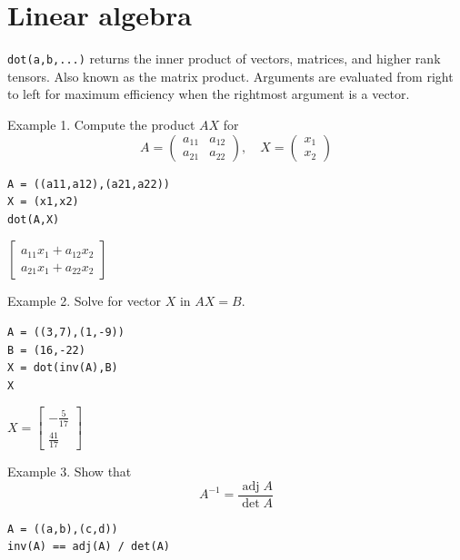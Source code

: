 
\newpage

\section{Linear algebra}

\verb$dot(a,b,...)$ returns the inner product of vectors, matrices,
and higher rank tensors.
Also known as the matrix product.
Arguments are evaluated from right to left
for maximum efficiency when the rightmost argument is a vector.

\bigskip

Example 1. Compute the product $AX$ for
\begin{equation*}
A=\begin{pmatrix}a_{11}&a_{12}\\a_{21}&a_{22}\end{pmatrix},
\quad
X=\begin{pmatrix}x_1\\x_2\end{pmatrix}
\end{equation*}

{\color{blue}
\begin{verbatim}
A = ((a11,a12),(a21,a22))
X = (x1,x2)
dot(A,X)
\end{verbatim}
}

$\displaystyle
\begin{bmatrix}
a_{11}x_1+a_{12}x_2
\\[1ex]
a_{21}x_1+a_{22}x_2
\end{bmatrix}
$

\bigskip

Example 2. Solve for vector $X$ in $AX=B$.

{\color{blue}
\begin{verbatim}
A = ((3,7),(1,-9))
B = (16,-22)
X = dot(inv(A),B)
X
\end{verbatim}
}

$\displaystyle
X=
\begin{bmatrix}
-\frac{5}{17}
\\[1ex]
\frac{41}{17}
\end{bmatrix}
$

\bigskip

Example 3. Show that
\begin{equation*}
A^{-1}=\frac{\operatorname{adj}A}{\operatorname{det}A}
\end{equation*}

{\color{blue}
\begin{verbatim}
A = ((a,b),(c,d))
inv(A) == adj(A) / det(A)
\end{verbatim}
}

